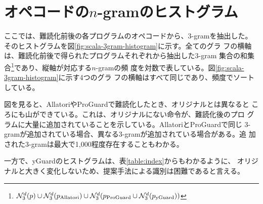 \documentclass[12pt,twoside]{jreport}
\newcommand{\distinctnnn}[1]{\mathcal{N}_3^d(#1)}
\begin{document}
\section{オペコードの$n$-gramのヒストグラム}

ここでは、難読化前後の各プログラムのオペコードから、3-gramを抽出した。
そのヒストグラムを図\ref{fig:scala-3gram-histogram}に示す。全てのグラ
フの横軸は、難読化前後で得られたプログラムそれぞれから抽出した$3$-gram
集合の和集合\footnote{ $\distinctnnn{p} \cup \distinctnnn{p_{\rm
      Allatori}} \cup \distinctnnn{p_{\rm ProGuard} \cup
    \distinctnnn{p_{\rm yGuard}}}$}であり、縦軸が対応する$n$-gramの頻
度を対数で表している。図\ref{fig:scala-3gram-histogram}に示す4つのグラ
フの横軸はすべて同じであり、頻度でソートしている。

図を見ると、AllatoriやProGuardで難読化したとき、オリジナルとは異なると
ころにも山ができている。これは、オリジナルにない命令が、難読化後のプロ
グラムに大量に追加されていることを示している。AllatoriとProGuardで同じ
3-gramが追加されている場合、異なる3-gramが追加されている場合がある。追
加された3-gramは最大で1,000程度存在することもわかる。

一方で、yGuardのヒストグラムは、表\ref{table:index}からもわかるように、
オリジナルと大きく変化しないため、提案手法による識別は困難であると言える。
\end{document}
